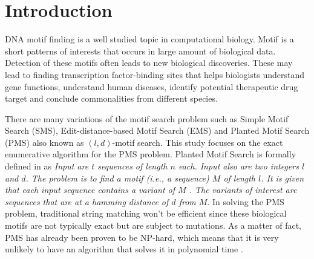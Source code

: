 \section{Introduction}

	DNA motif finding is a well studied topic in computational biology. Motif is a short patterns of interests that occurs in large amount of biological data. Detection of these motifs often leads to new biological discoveries. These may lead to finding transcription factor-binding sites that helps biologists understand gene functions, understand human diseases, identify potential therapeutic drug target and conclude commonalities from different species.

	There are many variations of the motif search problem such as Simple Motif Search (SMS), Edit-distance-based Motif Search (EMS) and Planted Motif Search (PMS) also known as $(l, d)$-motif search. This study focuses on the exact enumerative algorithm for the PMS problem. Planted Motif Search is formally defined in \cite{ExactAlgorithmsPMS} as \emph{Input are $t$ sequences of length $n$ each. Input also are two integers $l$ and $d$. The problem is to find a motif (i.e., a sequence) $M$ of length $l$. It is given that each input sequence contains a variant of $M$ . The variants of interest are sequences that are at a hamming distance of $d$ from $M$}. In solving the PMS problem, traditional string matching won't be efficient since these biological motifs are not typically exact but are subject to mutations. As a matter of fact, PMS has already been proven to be NP-hard, which means that it is very unlikely to have an algorithm that solves it in polynomial time \cite{Evans2003407}.


